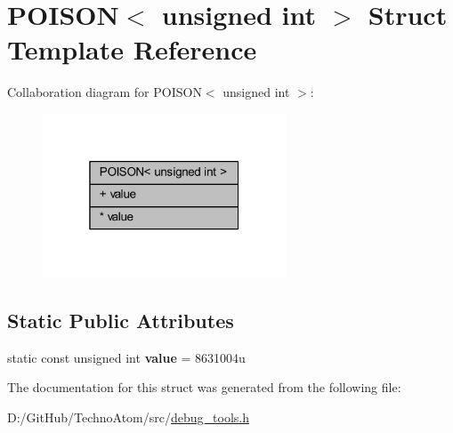 \hypertarget{struct_p_o_i_s_o_n_3_01unsigned_01int_01_4}{}\section{P\+O\+I\+S\+ON$<$ unsigned int $>$ Struct Template Reference}
\label{struct_p_o_i_s_o_n_3_01unsigned_01int_01_4}


Collaboration diagram for P\+O\+I\+S\+ON$<$ unsigned int $>$\+:
\nopagebreak
\begin{figure}[H]
\begin{center}
\leavevmode
\includegraphics[width=205pt]{struct_p_o_i_s_o_n_3_01unsigned_01int_01_4__coll__graph}
\end{center}
\end{figure}
\subsection*{Static Public Attributes}
\textbf{ }\par
\begin{DoxyCompactItemize}
\item 
\mbox{\label{struct_p_o_i_s_o_n_3_01unsigned_01int_01_4_a5f0e085925546c8f4cd331922253dcbe}} 
static const unsigned int {\bfseries value} = 8631004u
\end{DoxyCompactItemize}



The documentation for this struct was generated from the following file\+:\begin{DoxyCompactItemize}
\item 
D\+:/\+Git\+Hub/\+Techno\+Atom/src/\hyperlink{debug__tools_8h}{debug\+\_\+tools.\+h}\end{DoxyCompactItemize}
